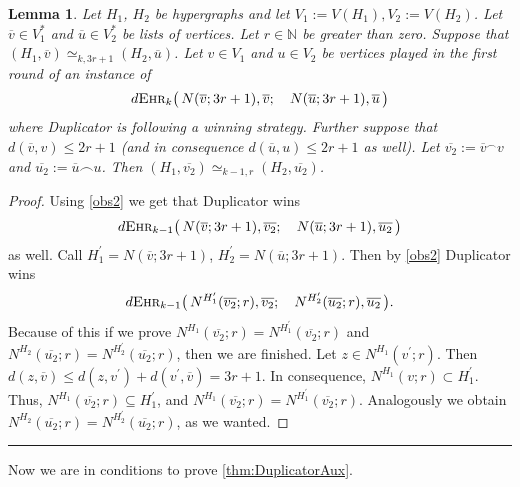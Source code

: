 \documentclass[12pt,notitlepage,a4paper]{article}
\newtheorem{lemma}{Lemma}[section]
\theoremstyle{definition}
\newcommand{\N}{\mathbb{N}}
\newcommand{\ehr}{\textsc{Ehr}}
\begin{document}
\begin{lemma} \label{lemm:Duplicator}
	Let $H_1$, $H_2$ be hypergraphs and let $V_1:=V(H_1),
	V_2:=V(H_2)$. Let $\overline{v}\in V_1^*$ and
	$\overline{u} \in V_2^*$ be lists of vertices. Let
	$r\in \N$ be greater than zero. Suppose that
	$(H_1,\overline{v})\simeq_{k,3r+1} (H_2,\overline{u})$.
	Let $v \in V_1$ and $u\in V_2$
	be vertices played in the first round of an instance of 
	\[
	d\ehr_k\big(\, N(\overline{v};3r+1),
	\overline{v}; \quad N(\overline{u};3r+1),\overline{u}\, \big)
	\]
	where Duplicator is following a winning strategy. Further suppose
	that $d(\overline{v},v)\leq 2r+1$ (and in consequence
	$d(\overline{u},u)\leq 2r+1$ as well). 
	Let $\overline{v_2}:=\overline{v}^\smallfrown v$
	and $\overline{u_2}:=\overline{u}\smallfrown u$.
	Then $(H_1,\overline{v_2})\simeq_{k-1,r}
	(H_2,\overline{u_2})$.
\end{lemma}

\begin{proof}
	Using \cref{obs2} we get that Duplicator wins 
	\[
	d\ehr_{k-1}\big(\, N(\overline{v};3r+1),
	\overline{v_2}; \quad N(\overline{u};3r+1)
	,\overline{u_2} \, \big)\]
	as well. Call $H^\prime_1=N(\overline{v};3r+1)$,
	$H^\prime_2=N(\overline{u};3r+1)$. Then by \cref{obs2}
	Duplicator wins
	\[
	d\ehr_{k-1}\big(\, N^{H^\prime_1}(
	\overline{v_2};r),\overline{v_2};\quad
	N^{H^\prime_2}(\overline{u_2};r),\overline{u_2}\, \big).
	\]
	Because of this if we prove $N^{H_1}(\overline{v_2};r)
	=N^{H^\prime_1}(\overline{v_2};r)$ and $N^{H_2}(\overline{u_2};r)
	=N^{H^\prime_2}(\overline{u_2};r)$, then we are finished. 
	Let $z\in N^{H_1}(v^\prime;r)$. Then
	$d(z,\overline{v})\leq d(z,v^\prime)+d(v^\prime,\overline{v})=3r+1$.
	In consequence, $N^{H_1}(v;r)\subset H^\prime_1$. Thus,
	$N^{H_1}(\overline{v_2};r)\subseteq H^\prime_1$, and $N^{H_1}(\overline{v_2};r)
	=N^{H^\prime_1}(\overline{v_2};r)$. Analogously we obtain 
	$N^{H_2}(\overline{u_2};r)=N^{H^\prime_2}(\overline{u_2};r)$, as we wanted. 
\end{proof}
\noindent\rule{2cm}{0.4pt}\par

Now we are in conditions to prove \cref{thm:DuplicatorAux}.
\end{document}
